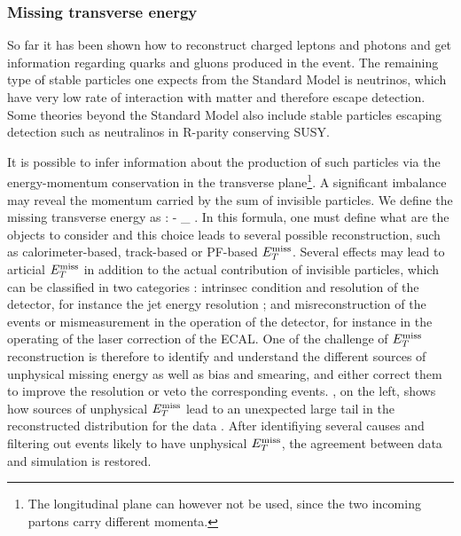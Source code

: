             \subsubsection{Missing transverse energy}

        So far it has been shown how to reconstruct charged leptons and photons and get
        information regarding quarks and gluons produced in the event. The remaining
        type of stable particles one expects from the Standard Model is neutrinos, which
        have very low rate of interaction with matter and therefore escape detection. Some
        theories beyond the Standard Model also include stable particles escaping detection
        such as neutralinos in R-parity conserving SUSY.

        It is possible to infer information about the production
        of such particles via the energy-momentum conservation in the transverse plane\footnote{The
        longitudinal plane can however not be used, since the two incoming partons carry
        different momenta.}. A significant imbalance may reveal the momentum carried by
        the sum of invisible particles. We define the missing transverse energy as :
        {
            \MET {} - \sum_{} \vec{\pT}.
        }
        In this formula, one must define what are the objects to consider and this choice
        leads to several possible reconstruction, such as calorimeter-based, track-based
        or PF-based $E_T^\text{miss}$. Several effects may lead to articial $E_T^\text{miss}$ in addition to the
        actual contribution of invisible particles, which can be classified in two categories :
        intrinsec condition and resolution of the detector, for instance the jet energy
        resolution ; and misreconstruction of the events or mismeasurement in the
        operation of the detector, for instance in the operating of the laser correction
        of the ECAL. One of the challenge of $E_T^\text{miss}$ reconstruction is therefore to identify
        and understand the different sources of unphysical missing energy as well as bias and
        smearing, and either correct them to improve the resolution or veto the corresponding
        events.
        , on the left, shows how sources of unphysical $E_T^\text{miss}$
        lead to an unexpected large tail in the reconstructed distribution for the data \cite{METperf}.
        After identifiying several causes and filtering out events likely to have unphysical
        $E_T^\text{miss}$, the agreement between data and simulation is restored.

